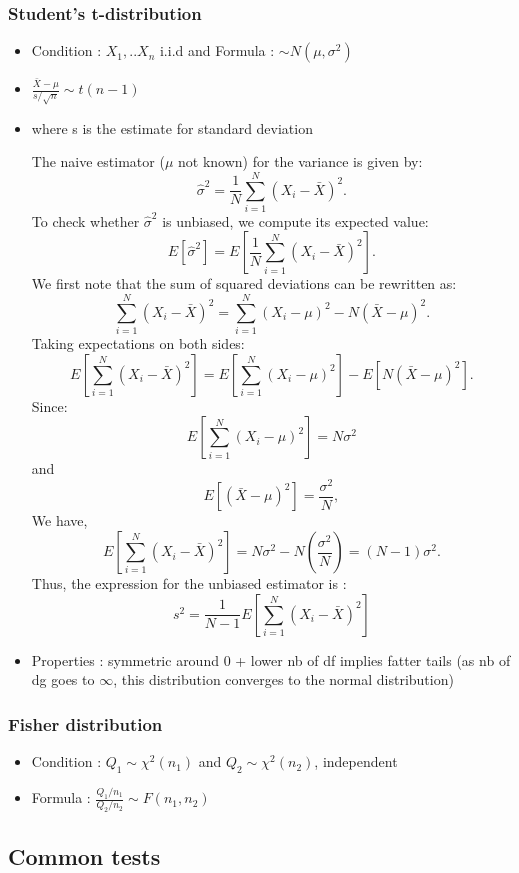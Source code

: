 \documentclass{article}
\begin{document}
\subsubsection{Student's t-distribution}
\begin{itemize}
    \item Condition : $X_1,..X_n$ i.i.d and Formula : $\sim N(\mu,\sigma^2)$
    \item $\frac{\bar{X}-\mu}{s/\sqrt{n}}\sim t(n-1)$
    \item where s is the estimate for standard deviation 
    \begin{proofbox}
The naive estimator ($\mu$ not known) for the variance is given by:
$$\hat{\sigma}^2 = \frac{1}{N} \sum_{i=1}^{N} (X_i - \bar{X})^2.$$
To check whether $\hat{\sigma}^2$ is unbiased, we compute its expected value:
$$E[\hat{\sigma}^2] = E\left[\frac{1}{N} \sum_{i=1}^{N} (X_i - \bar{X})^2\right].$$
We first note that the sum of squared deviations can be rewritten as:
$$\sum_{i=1}^{N} (X_i - \bar{X})^2 = \sum_{i=1}^{N} (X_i - \mu)^2 - N(\bar{X} - \mu)^2.$$
Taking expectations on both sides:
$$E\left[\sum_{i=1}^{N} (X_i - \bar{X})^2\right] = E\left[\sum_{i=1}^{N} (X_i - \mu)^2\right] - E\left[N(\bar{X} - \mu)^2\right].$$
Since:
$$E\left[\sum_{i=1}^{N} (X_i - \mu)^2\right] = N \sigma^2$$
and
$$E\left[(\bar{X} - \mu)^2\right] = \frac{\sigma^2}{N},$$
We have,
$$E\left[\sum_{i=1}^{N} (X_i - \bar{X})^2\right] = N\sigma^2 - N\left(\frac{\sigma^2}{N}\right) = (N-1)\sigma^2.$$
Thus, the expression for the unbiased estimator is : 
$$s^2 = \frac{1}{N-1}E\left[\sum_{i=1}^{N} (X_i - \bar{X})^2\right]$$
    \end{proofbox}
    \item Properties : symmetric around 0  + lower nb of df implies fatter tails (as nb of dg goes to $\infty$, this distribution converges to the normal distribution)
\end{itemize}

\subsubsection{Fisher distribution}
\begin{itemize}
    \item Condition : $Q_1\sim \chi^2(n_1)$ and $Q_2\sim \chi^2(n_2)$, independent
    \item Formula : $\frac{Q_1/n_1}{Q_2/n_2}\sim F(n_1,n_2)$
\end{itemize}

\subsection{Common tests}
\end{document}
